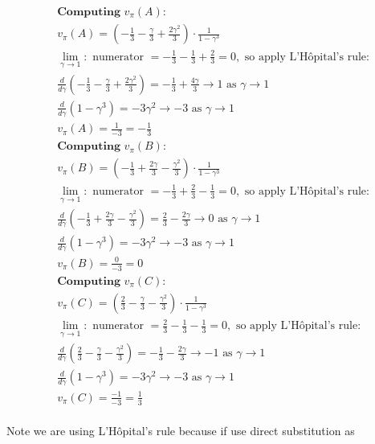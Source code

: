 \documentclass{article}
\begin{document}
\begin{align*}
&\textbf{Computing } v_{\pi}(A): \\
&v_{\pi}(A) = \left(-\frac{1}{3} - \frac{\gamma}{3} + \frac{2\gamma^2}{3}\right) \cdot \frac{1}{1-\gamma^3} \\
&\lim_{\gamma \to 1}: \text{ numerator } = -\frac{1}{3} - \frac{1}{3} + \frac{2}{3} = 0, \text{ so apply L'Hôpital's rule:} \\
&\frac{d}{d\gamma}\left(-\frac{1}{3} - \frac{\gamma}{3} + \frac{2\gamma^2}{3}\right) = -\frac{1}{3} + \frac{4\gamma}{3} \to 1 \text{ as } \gamma \to 1 \\
&\frac{d}{d\gamma}(1 - \gamma^3) = -3\gamma^2 \to -3 \text{ as } \gamma \to 1 \\
&v_{\pi}(A) = \frac{1}{-3} = -\frac{1}{3} \\[10pt]
&\textbf{Computing } v_{\pi}(B): \\
&v_{\pi}(B) = \left(-\frac{1}{3} + \frac{2\gamma}{3} - \frac{\gamma^2}{3}\right) \cdot \frac{1}{1-\gamma^3} \\
&\lim_{\gamma \to 1}: \text{ numerator } = -\frac{1}{3} + \frac{2}{3} - \frac{1}{3} = 0, \text{ so apply L'Hôpital's rule:} \\
&\frac{d}{d\gamma}\left(-\frac{1}{3} + \frac{2\gamma}{3} - \frac{\gamma^2}{3}\right) = \frac{2}{3} - \frac{2\gamma}{3} \to 0 \text{ as } \gamma \to 1 \\
&\frac{d}{d\gamma}(1 - \gamma^3) = -3\gamma^2 \to -3 \text{ as } \gamma \to 1 \\
&v_{\pi}(B) = \frac{0}{-3} = 0 \\[10pt]
&\textbf{Computing } v_{\pi}(C): \\
&v_{\pi}(C) = \left(\frac{2}{3} - \frac{\gamma}{3} - \frac{\gamma^2}{3}\right) \cdot \frac{1}{1-\gamma^3} \\
&\lim_{\gamma \to 1}: \text{ numerator } = \frac{2}{3} - \frac{1}{3} - \frac{1}{3} = 0, \text{ so apply L'Hôpital's rule:} \\
&\frac{d}{d\gamma}\left(\frac{2}{3} - \frac{\gamma}{3} - \frac{\gamma^2}{3}\right) = -\frac{1}{3} - \frac{2\gamma}{3} \to -1 \text{ as } \gamma \to 1 \\
&\frac{d}{d\gamma}(1 - \gamma^3) = -3\gamma^2 \to -3 \text{ as } \gamma \to 1 \\
&v_{\pi}(C) = \frac{-1}{-3} = \frac{1}{3}
\end{align*}
\\

Note we are using L'Hôpital's rule because if use direct substitution as 
\end{document}
